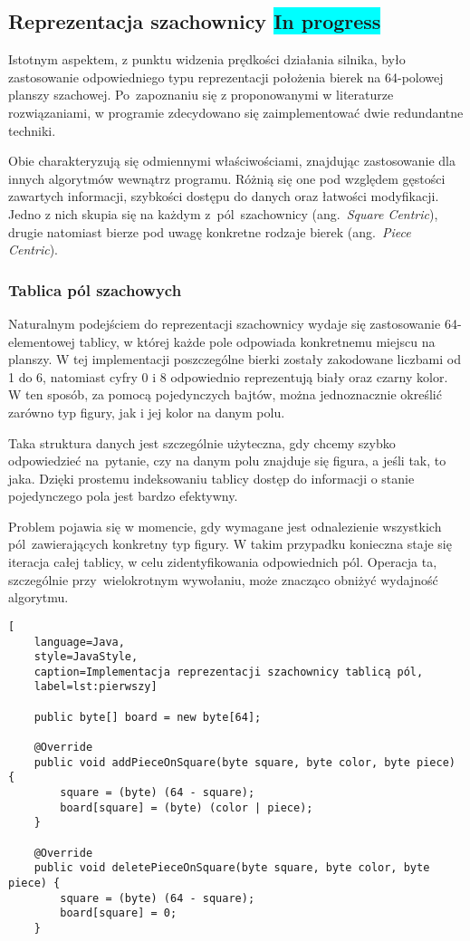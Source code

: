\subsection{Reprezentacja szachownicy \colorbox{cyan}{In progress}}
\label{subsec:reprezentacja-szachownicy}

Istotnym aspektem, z punktu widzenia prędkości działania silnika, było zastosowanie odpowiedniego typu reprezentacji położenia bierek na 64-polowej planszy szachowej.
Po~zapoznaniu się z proponowanymi w literaturze rozwiązaniami, w programie zdecydowano się zaimplementować dwie redundantne techniki.

Obie charakteryzują się odmiennymi właściwościami, znajdując zastosowanie dla innych algorytmów wewnątrz programu.
Różnią się one pod względem gęstości zawartych informacji, szybkości dostępu do danych oraz łatwości modyfikacji.
Jedno z nich skupia się na każdym z~pól~szachownicy (ang.~\emph{Square Centric}), drugie natomiast bierze pod uwagę konkretne rodzaje bierek (ang.~\emph{Piece Centric}).

\subsubsection{Tablica pól szachowych}

Naturalnym podejściem do reprezentacji szachownicy wydaje się zastosowanie 64-elementowej tablicy, w której każde pole odpowiada konkretnemu miejscu na planszy.
W tej implementacji poszczególne bierki zostały zakodowane liczbami od 1 do 6, natomiast cyfry 0 i 8 odpowiednio reprezentują biały oraz czarny kolor.
W ten sposób, za pomocą pojedynczych bajtów, można jednoznacznie określić zarówno typ figury, jak i jej kolor na danym polu.

Taka struktura danych jest szczególnie użyteczna, gdy chcemy szybko odpowiedzieć na~pytanie, czy na danym polu znajduje się figura, a jeśli tak, to jaka.
Dzięki prostemu indeksowaniu tablicy dostęp do informacji o stanie pojedynczego pola jest bardzo efektywny.

Problem pojawia się w momencie, gdy wymagane jest odnalezienie wszystkich pól~zawierających konkretny typ figury.
W takim przypadku konieczna staje się iteracja całej tablicy, w celu zidentyfikowania odpowiednich pól.
Operacja ta, szczególnie przy~wielokrotnym wywołaniu, może znacząco obniżyć wydajność algorytmu.

\begin{lstlisting}[
    language=Java,
    style=JavaStyle,
    caption=Implementacja reprezentacji szachownicy tablicą pól,
    label=lst:pierwszy]

    public byte[] board = new byte[64];

    @Override
    public void addPieceOnSquare(byte square, byte color, byte piece) {
        square = (byte) (64 - square);
        board[square] = (byte) (color | piece);
    }

    @Override
    public void deletePieceOnSquare(byte square, byte color, byte piece) {
        square = (byte) (64 - square);
        board[square] = 0;
    }

\end{lstlisting}


